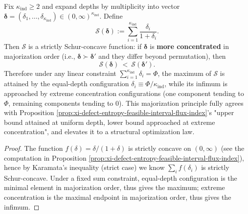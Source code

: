 \begin{proposition}\label{prop:xi-defect-entropy-schur-concavity}
Fix \(\kappa_{\mathrm{ind}}\ge 2\) and expand depths by multiplicity into vector
\(\boldsymbol{\delta}=(\delta_1,\dots,\delta_{\kappa_{\mathrm{ind}}})\in(0,\infty)^{\kappa_{\mathrm{ind}}}\).
Define
\[
\mathcal{S}(\boldsymbol{\delta})
:=\sum_{i=1}^{\kappa_{\mathrm{ind}}}\frac{\delta_i}{1+\delta_i}.
\]
Then \(\mathcal{S}\) is a strictly Schur-concave function: if \(\boldsymbol{\delta}\) is \textbf{more concentrated} in majorization order (i.e., \(\boldsymbol{\delta}\succ \boldsymbol{\delta}'\) and they differ beyond permutation), then
\[
\mathcal{S}(\boldsymbol{\delta})\ <\ \mathcal{S}(\boldsymbol{\delta}').
\]
Therefore under any linear constraint \(\sum_{i=1}^{\kappa_{\mathrm{ind}}}\delta_i=\Phi\),
the maximum of \(\mathcal{S}\) is attained by the equal-depth configuration \(\delta_i\equiv \Phi/\kappa_{\mathrm{ind}}\), while its infimum is approached by extreme concentration configurations (one component tending to \(\Phi\), remaining components tending to \(0\)).
This majorization principle fully agrees with Proposition \ref{prop:xi-defect-entropy-feasible-interval-flux-index}'s "upper bound attained at uniform depth, lower bound approached at extreme concentration", and elevates it to a structural optimization law.
\end{proposition}
\begin{proof}
The function \(f(\delta)=\delta/(1+\delta)\) is strictly concave on \((0,\infty)\) (see the computation in Proposition \ref{prop:xi-defect-entropy-feasible-interval-flux-index}),
hence by Karamata's inequality (strict case) we know \(\sum_i f(\delta_i)\) is strictly Schur-concave.
Under a fixed sum constraint, equal-depth configuration is the minimal element in majorization order, thus gives the maximum; extreme concentration is the maximal endpoint in majorization order, thus gives the infimum.
\end{proof}

